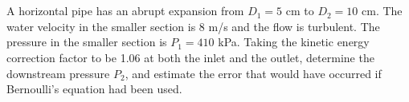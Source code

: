 \section{}

A horizontal pipe has an abrupt expansion from $D_1 = 5$ cm to $D_2 = 10$ cm. The water velocity in the smaller section is 
8 m/s and the flow is turbulent. The pressure in the smaller section is $P_1 = 410$ kPa. Taking the kinetic energy correction 
factor to be 1.06 at both the inlet and the outlet, determine the downstream pressure $P_2$, and estimate the error that would 
have occurred if Bernoulli's equation had been used.

